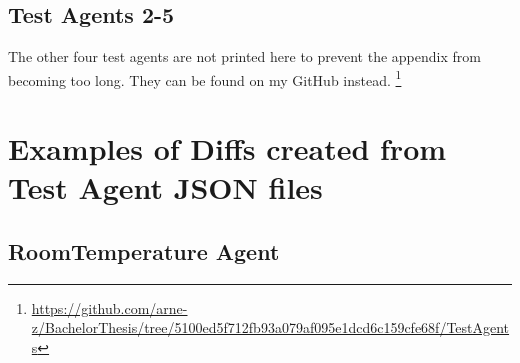 \section{Test Agents 2-5}
The other four test agents are not printed here to prevent the appendix from becoming too long. They can be found on my GitHub instead.
\footnote{\url{https://github.com/arne-z/BachelorThesis/tree/5100ed5f712fb93a079af095e1dcd6c159cfe68f/TestAgents}}

\chapter{Examples of Diffs created from Test Agent JSON files}

\section{RoomTemperature Agent}
\label{RoomTemperature Agent JSONDiff}

